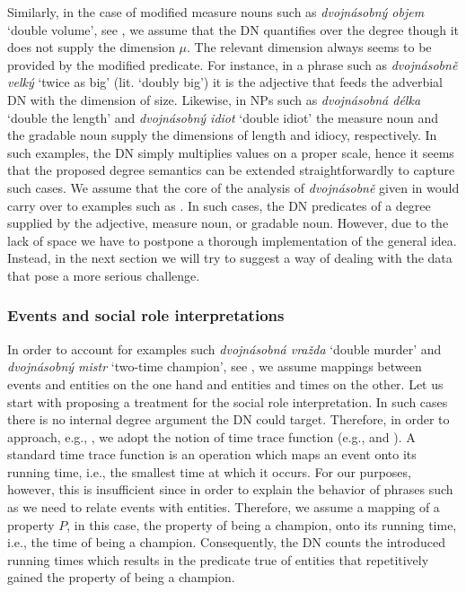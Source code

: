 \documentclass[output=paper,
modfonts,
hidelinks,
newtxmath
]{langscibook}
\begin{document}
\noindent Similarly, in the case of modified measure nouns such as \textit{dvojnásobný objem} `double volume', see , we assume that the DN quantifies over the degree though it does not supply the dimension $\mu$. The relevant dimension always seems to be provided by the modified predicate. For instance, in a phrase such as \textit{dvojnásobně velký} `twice as big' (lit. `doubly big') it is the adjective that feeds the adverbial DN with the dimension of size. Likewise, in NPs such as \textit{dvojnásobná délka} `double the length' and \textit{dvojnásobný idiot} `double idiot' the measure noun and the gradable noun supply the dimensions of length and idiocy, respectively. In such examples, the DN simply multiplies values on a proper scale, hence it seems that the proposed degree semantics can be extended straightforwardly to capture such cases. We assume that the core of the analysis of \textit{dvojnásobně} given in  would carry over to examples such as . In such cases, the DN predicates of a degree supplied by the adjective, measure noun, or gradable noun. However, due to the lack of space we have to postpone a thorough implementation of the general idea. Instead, in the next section we will try to suggest a way of dealing with the data that pose a more serious challenge.

\subsubsection{Events and social role interpretations}\label{events-and-social-role-interpretations}

In order to account for examples such \textit{dvojnásobná vražda} `double murder' and \textit{dvojnásobný mistr} `two-time champion', see , we assume mappings between events and entities on the one hand and entities and times on the other. Let us start with proposing a treatment for the social role interpretation. In such cases there is no internal degree argument the DN could target. Therefore, in order to approach, e.g., , we adopt the notion of time trace function (e.g., \citealt{krifka_nominal_1989} and \citealt{lasersohn_plurality_1995}). A standard time trace function is an operation which maps an event onto its running time, i.e., the smallest time at which it occurs. For our purposes, however, this is insufficient since in order to explain the behavior of phrases such as  we need to relate events with entities. Therefore, we assume a mapping of a property $P$, in this case, the property of being a champion, onto its running time, i.e., the time of being a champion. Consequently, the DN counts the introduced running times which results in the predicate true of entities that repetitively gained the property of being a champion.
\end{document}
